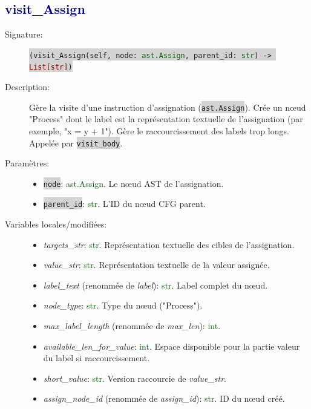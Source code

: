 \documentclass[11pt,a4paper]{article}
\newcommand{\code}[1]{\colorbox{lightgray}{\texttt{\small #1}}}
\newcommand{\var}[1]{\textit{#1}}
\newcommand{\vartype}[1]{\textcolor{darkgreen}{#1}}
\newcommand{\methodname}[1]{\textbf{\textcolor{darkblue}{#1}}}
\newcommand{\param}[1]{\code{#1}}
\newcommand{\rettype}[1]{\textcolor{darkred}{#1}}
\begin{document}
\subsection*{\methodname{visit\_Assign}}
\begin{description}
    \item[Signature:] \code{(visit\_Assign(self, node: \vartype{ast.Assign}, parent\_id: \vartype{str}) -> \rettype{List[str]})}
    \item[Description:] Gère la visite d'une instruction d'assignation (\code{ast.Assign}). Crée un nœud "Process" dont le label est la représentation textuelle de l'assignation (par exemple, "x = y + 1"). Gère le raccourcissement des labels trop longs. Appelée par \code{visit\_body}.
    \item[Paramètres:]
    \begin{itemize}
        \item \param{node}: \vartype{ast.Assign}. Le nœud AST de l'assignation.
        \item \param{parent\_id}: \vartype{str}. L'ID du nœud CFG parent.
    \end{itemize}
    \item[Variables locales/modifiées:]
    \begin{itemize}
        \item \var{targets\_str}: \vartype{str}. Représentation textuelle des cibles de l'assignation.
        \item \var{value\_str}: \vartype{str}. Représentation textuelle de la valeur assignée.
        \item \var{label\_text} (renommée de \var{label}): \vartype{str}. Label complet du nœud.
        \item \var{node\_type}: \vartype{str}. Type du nœud ("Process").
        \item \var{max\_label\_length} (renommée de \var{max\_len}): \vartype{int}.
        \item \var{available\_len\_for\_value}: \vartype{int}. Espace disponible pour la partie valeur du label si raccourcissement.
        \item \var{short\_value}: \vartype{str}. Version raccourcie de \var{value\_str}.
        \item \var{assign\_node\_id} (renommée de \var{assign\_id}): \vartype{str}. ID du nœud créé.
    \end{itemize}
\end{description}
\end{document}
